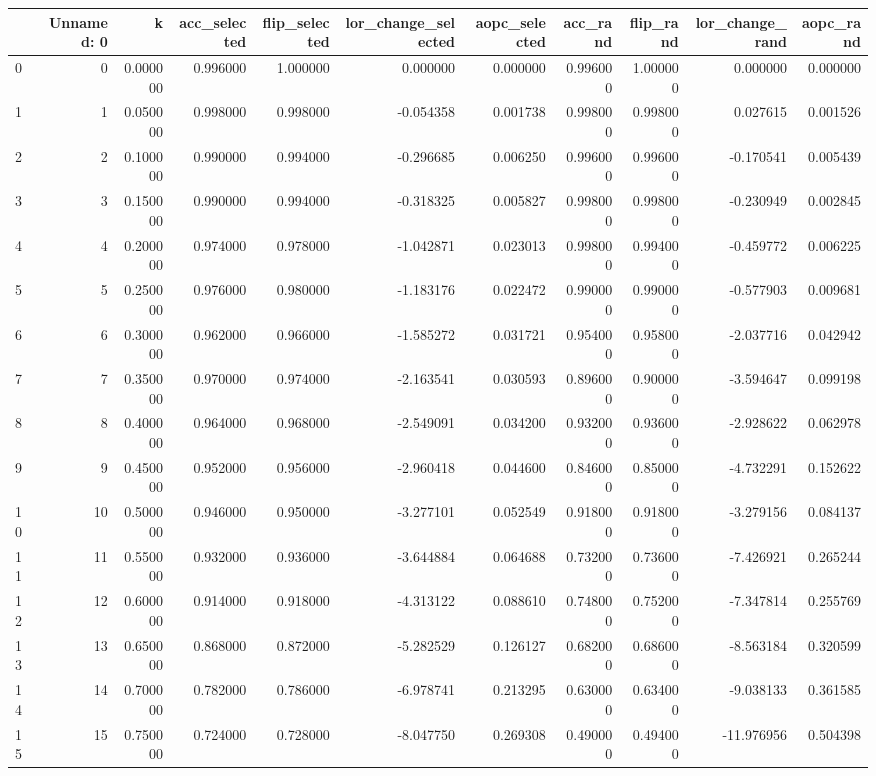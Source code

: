 \begin{tabular}{lrrrrrrrrrr}
\toprule
 & Unnamed: 0 & k & acc_selected & flip_selected & lor_change_selected & aopc_selected & acc_rand & flip_rand & lor_change_rand & aopc_rand \\
\midrule
0 & 0 & 0.000000 & 0.996000 & 1.000000 & 0.000000 & 0.000000 & 0.996000 & 1.000000 & 0.000000 & 0.000000 \\
1 & 1 & 0.050000 & 0.998000 & 0.998000 & -0.054358 & 0.001738 & 0.998000 & 0.998000 & 0.027615 & 0.001526 \\
2 & 2 & 0.100000 & 0.990000 & 0.994000 & -0.296685 & 0.006250 & 0.996000 & 0.996000 & -0.170541 & 0.005439 \\
3 & 3 & 0.150000 & 0.990000 & 0.994000 & -0.318325 & 0.005827 & 0.998000 & 0.998000 & -0.230949 & 0.002845 \\
4 & 4 & 0.200000 & 0.974000 & 0.978000 & -1.042871 & 0.023013 & 0.998000 & 0.994000 & -0.459772 & 0.006225 \\
5 & 5 & 0.250000 & 0.976000 & 0.980000 & -1.183176 & 0.022472 & 0.990000 & 0.990000 & -0.577903 & 0.009681 \\
6 & 6 & 0.300000 & 0.962000 & 0.966000 & -1.585272 & 0.031721 & 0.954000 & 0.958000 & -2.037716 & 0.042942 \\
7 & 7 & 0.350000 & 0.970000 & 0.974000 & -2.163541 & 0.030593 & 0.896000 & 0.900000 & -3.594647 & 0.099198 \\
8 & 8 & 0.400000 & 0.964000 & 0.968000 & -2.549091 & 0.034200 & 0.932000 & 0.936000 & -2.928622 & 0.062978 \\
9 & 9 & 0.450000 & 0.952000 & 0.956000 & -2.960418 & 0.044600 & 0.846000 & 0.850000 & -4.732291 & 0.152622 \\
10 & 10 & 0.500000 & 0.946000 & 0.950000 & -3.277101 & 0.052549 & 0.918000 & 0.918000 & -3.279156 & 0.084137 \\
11 & 11 & 0.550000 & 0.932000 & 0.936000 & -3.644884 & 0.064688 & 0.732000 & 0.736000 & -7.426921 & 0.265244 \\
12 & 12 & 0.600000 & 0.914000 & 0.918000 & -4.313122 & 0.088610 & 0.748000 & 0.752000 & -7.347814 & 0.255769 \\
13 & 13 & 0.650000 & 0.868000 & 0.872000 & -5.282529 & 0.126127 & 0.682000 & 0.686000 & -8.563184 & 0.320599 \\
14 & 14 & 0.700000 & 0.782000 & 0.786000 & -6.978741 & 0.213295 & 0.630000 & 0.634000 & -9.038133 & 0.361585 \\
15 & 15 & 0.750000 & 0.724000 & 0.728000 & -8.047750 & 0.269308 & 0.490000 & 0.494000 & -11.976956 & 0.504398 \\

\end{tabular}
